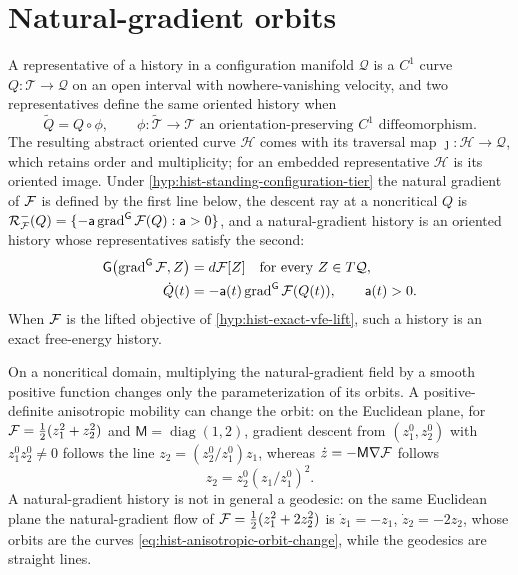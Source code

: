 \section{Natural-gradient orbits}
\label{sec:hist-natural-gradient-oriented-orbit}

A representative of a history in a configuration manifold $\mathcal Q$ is a $C^1$ curve
$Q:\mathcal T\to\mathcal Q$ on an open interval with nowhere-vanishing velocity, and two
representatives define the same oriented history when
\begin{equation}
\widetilde Q=Q\circ\phi,
\qquad
\phi:\widetilde{\mathcal T}\longrightarrow\mathcal T
\text{ an orientation-preserving $C^1$ diffeomorphism}.
\label{eq:hist-oriented-reparameterization-equivalence}
\end{equation}
The resulting abstract oriented curve $\mathscr H$ comes with its traversal map
$\jmath:\mathscr H\to\mathcal Q$, which retains order and multiplicity; for an embedded
representative $\mathscr H$ is its oriented image.  Under
\cref{hyp:hist-standing-configuration-tier} the natural gradient of $\mathcal F$ is defined
by the first line below, the descent ray at a noncritical $Q$ is
$\mathcal R^-_{\mathcal F}(Q)=\{-\mathsf a\operatorname{grad}^{\mathsf G}\mathcal F(Q):\mathsf
a>0\}$, and a natural-gradient history is an oriented history whose representatives
satisfy the second:
\begin{align}
\mathsf G\bigl(\operatorname{grad}^{\mathsf G}\mathcal F,Z\bigr)
&=d\mathcal F[Z]
\quad\text{for every }Z\in T\mathcal Q,
\label{eq:hist-fisher-gradient-definition}\\
\dot Q(t)
&=-\mathsf a(t)\operatorname{grad}^{\mathsf G}\mathcal F(Q(t)),
\qquad \mathsf a(t)>0 .
\label{eq:hist-vfe-ray-representative}
\end{align}
When $\mathcal F$ is the lifted objective of \cref{hyp:hist-exact-vfe-lift}, such a history
is an exact free-energy history.

On a noncritical domain, multiplying the natural-gradient field by a smooth positive
function changes only the parameterization of its orbits.  A positive-definite
anisotropic mobility can change the orbit: on the Euclidean plane, for
$\mathcal F=\tfrac12(z_1^2+z_2^2)$ and $\mathsf M=\operatorname{diag}(1,2)$, gradient
descent from $(z_1^0,z_2^0)$ with $z_1^0z_2^0\ne0$ follows the line $z_2=(z_2^0/z_1^0)z_1$, whereas
$\dot z=-\mathsf M\nabla\mathcal F$ follows
\begin{equation}
z_2=z_2^0\left(z_1/z_1^0\right)^2 .
\label{eq:hist-anisotropic-orbit-change}
\end{equation}
A natural-gradient history is not in general a geodesic: on the same Euclidean plane the
natural-gradient flow of $\mathcal F=\tfrac12(z_1^2+2z_2^2)$ is $\dot z_1=-z_1$,
$\dot z_2=-2z_2$, whose orbits are the curves \eqref{eq:hist-anisotropic-orbit-change},
while the geodesics are straight lines.  

